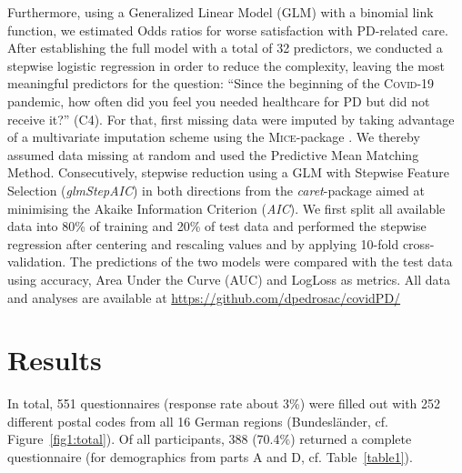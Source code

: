 \documentclass[a4paper,oneside,11pt,english]{scrartcl}
\begin{document}
Furthermore, using a Generalized Linear Model (\textsc{GLM}) with a binomial link function, we estimated Odds ratios for worse satisfaction with \textsc{PD}-related care. After establishing the full model with a total of 32 predictors, we conducted a stepwise logistic regression in order to reduce the complexity, leaving the most meaningful predictors for the question: ``Since the beginning of the \textsc{Covid}-19 pandemic, how often did you feel you needed healthcare for \textsc{PD} but did not receive it?'' (C4). For that, first missing data were imputed by taking advantage of a multivariate imputation scheme using the \textsc{Mice}-package \cite{vanbuuren2011}. We thereby assumed data missing at random and used the Predictive Mean Matching Method. Consecutively, stepwise reduction using a \textsc{GLM} with Stepwise Feature Selection (\textit{glmStepAIC}) in both directions from the \textit{caret}-package \cite{kuhn2008} aimed at minimising the Akaike Information Criterion (\textit{AIC}). We first split all available data into 80\% of training and 20\% of test data and performed the stepwise regression after centering and rescaling values and by applying 10-fold cross-validation. The predictions of the two models were compared with the test data using accuracy, Area Under the Curve (\textsc{AUC}) and LogLoss as metrics. All data and analyses are available at \url{https://github.com/dpedrosac/covidPD/}

\newpage


\section*{Results}
In total, 551 questionnaires (response rate about 3\%) were filled out with 252 different postal codes from all 16 German regions (Bundesländer, cf. Figure~\ref{fig1:total}). Of all participants, 388 (70.4$\%$) returned a complete questionnaire (for demographics from parts A and D, cf. Table~\ref{table1}).
\end{document}
